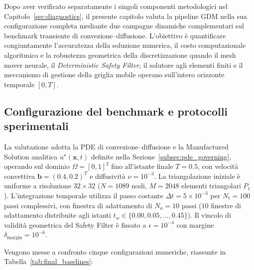 Dopo aver verificato separatamente i singoli componenti metodologici nel Capitolo~\ref{sec:diagnostics}, il presente capitolo valuta la pipeline GDM nella sua configurazione completa mediante due campagne dinamiche complementari sul benchmark transiente di convezione--diffusione. L'obiettivo è quantificare congiuntamente l'accuratezza della soluzione numerica, il costo computazionale algoritmico e la robustezza geometrica della discretizzazione quando il mesh mover neurale, il \textit{Deterministic Safety Filter}, il solutore agli elementi finiti e il meccanismo di gestione della griglia mobile operano sull'intero orizzonte temporale $[0,T]$.

\subsection{Configurazione del benchmark e protocolli sperimentali}

\label{subsec:benchmark_setup}

La valutazione adotta la PDE di convezione--diffusione e la Manufactured Solution analitica $u^\star(\mathbf{x},t)$ definite nella Sezione~\ref{subsec:pde_governing}, operando sul dominio $\Omega=[0,1]^2$ fino all'istante finale $T=0.5$, con velocità convettiva $\mathbf{b}=(0.4,0.2)^T$ e diffusività $\nu=10^{-3}$. La triangolazione iniziale è uniforme a risoluzione $32\times32$ ($N=1089$ nodi, $M=2048$ elementi triangolari $P_1$). L'integrazione temporale utilizza il passo costante $\Delta t=5\times10^{-3}$ per $N_t=100$ passi complessivi, con finestra di adattamento di $N_a=10$ passi ($10$ finestre di adattamento distribuite agli istanti $t_w \in \{0.00, 0.05, \ldots, 0.45\}$). Il vincolo di validità geometrica del Safety Filter è fissato a $\epsilon=10^{-4}$ con margine $\delta_{\mathrm{margin}}=10^{-6}$.

Vengono messe a confronto cinque configurazioni numeriche, riassunte in Tabella~\ref{tab:final_baselines}:

